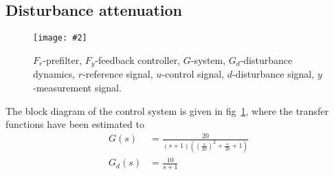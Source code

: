 \documentclass[11pt,a4paper]{article}
\newcommand{\image}[3]{
	\begin{figure}[!ht]
		\centering
	    \texttt{[image: \#2]}
		\caption{#3}
		\label{fig:#2}
	\end{figure}
}
\begin{document}
\subsection{Disturbance attenuation}
\image{0.75}{system2}{$F_{r}$-prefilter, $F_{y}$-feedback controller, $G$-system, $G_{d}$-disturbance dynamics, $r$-reference signal, $u$-control signal, $d$-disturbance signal, $y$-measurement signal.}

\par The block diagram of the control system is given in fig~\ref{fig:system2}, where the transfer functions have been estimated to
\begin{align*}
	G(s) &= \frac{20}{(s+1)((\frac{s}{20})^{2}+\frac{s}{20}+1)} \\
	G_{d}(s) &= \frac{10}{s+1}
\end{align*}

\end{document}
